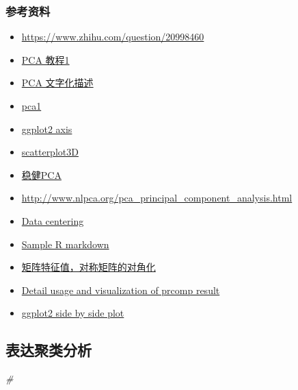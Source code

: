 \documentclass[]{article}
\newenvironment{Shaded}{\begin{snugshade}}{\end{snugshade}}
\newcommand{\CommentTok}[1]{\textcolor[rgb]{0.56,0.35,0.01}{\textit{{#1}}}}
\numberwithin{figure}{section}
\numberwithin{table}{section}
\theoremstyle{definition}
\theoremstyle{definition}
\theoremstyle{definition}
\theoremstyle{remark}
\begin{document}
\subsubsection{参考资料}

\begin{itemize}
\item
  \url{https://www.zhihu.com/question/20998460}
\item
  \href{http://blog.csdn.net/zhongkelee/article/details/44064401}{PCA
  教程1}
\item
  \href{http://www.xiaolingzi.com/?p=963}{PCA 文字化描述}
\item
  \href{http://wenku.baidu.com/link?url=hsnzR5gUvsPBwkwwcWU4T3aTSC_fsZDxAmaGGBPfumsIW_I0TJAdJEWhFyiQgw7uA58DKukR-9g5x0DyzE97kHddMaXOxk_iZBjoIdbdB6e}{pca1}
\item
  \href{http://stackoverflow.com/questions/22092220/plot-only-y-axis-but-nothing-else}{ggplot2
  axis}
\item
  \href{http://www.sthda.com/english/wiki/scatterplot3d-3d-graphics-r-software-and-data-visualization}{scatterplot3D}
\item
  \href{http://dong.farbox.com/32}{稳健PCA}
\item
  \url{http://www.nlpca.org/pca_principal_component_analysis.html}
\item
  \href{http://gastonsanchez.com/how-to/2014/01/15/Center-data-in-R/}{Data
  centering}
\item
  \href{http://www.statpower.net/Content/310/R\%20Stuff/SampleMarkdown.html}{Sample
  R markdown}
\item
  \href{http://www2.edu-edu.com.cn/lesson_crs78/self/02198/resource/contents/ch_05/ch_05.html}{矩阵特征值，对称矩阵的对角化}
\item
  \href{http://www.sthda.com/english/wiki/principal-component-analysis-in-r-prcomp-vs-princomp-r-software-and-data-mining}{Detail
  usage and visualization of prcomp result}
\item
  \href{http://stackoverflow.com/questions/1249548/side-by-side-plots-with-ggplot2}{ggplot2
  side by side plot}
\end{itemize}

\subsection{表达聚类分析}

\begin{Shaded}
\begin{Highlighting}[]
\CommentTok{#}
\end{Highlighting}
\end{Shaded}
\end{document}
